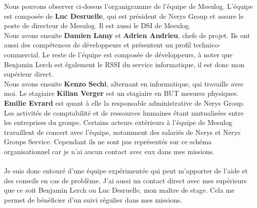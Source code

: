\documentclass[a4paper, 11pt]{article}
\begin{document}
\par\bigskip
Nous pouvons observer ci-dessus l'organigramme de l'équipe de Mesulog. L'équipe est composée de \textbf{Luc Desruelle}, qui est président de Nerys Group et assure le poste de directeur de Mesulog. Il est aussi le DSI de Mesulog.\\
Nous avons ensuite \textbf{Damien Lamy} et \textbf{Adrien Andrieu}, chefs de projet. Ils ont aussi des compétences de développeurs et présentent un profil technico-commercial. Le reste de l'équipe est composée de développeurs, à noter que Benjamin Lerch est également le RSSI du service informatique, il est donc mon supérieur direct.\\
Nous avons ensuite \textbf{Kenzo Sechi}, alternant en informatique, qui travaille avec moi. Le stagiaire \textbf{Kilian Verger} est un stagiaire en BUT mesures physiques.\\
\textbf{Emilie Evrard} est quant à elle la responsable administrative de Nerys Group. Les activités de comptabilité et de ressources humaines étant mutualisées entre les entreprises du groupe. Certains acteurs extérieurs à l'équipe de Mesulog travaillent de concert avec l'équipe, notamment des salariés de Nerys et Nerys Groups Service. Cependant ils ne sont pas représentés sur ce schéma organisationnel car je n'ai aucun contact avec eux dans mes missions.\\
\\
Je suis donc entouré d'une équipe expérimentée qui peut m'apporter de l'aide et des conseils en cas de problème. J'ai aussi un contact direct avec mes supérieurs que ce soit Benjamin Lerch ou Luc Desruelle, mon maître de stage. Cela me permet de bénéficier d'un suivi régulier dans mes missions.
\newpage
\end{document}
